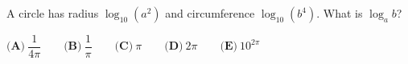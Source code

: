 A circle has radius $\log_{10}(a^2)$ and circumference $\log_{10}(b^4)$. What is $\log_ab$?

$\textbf{(A)}\ \dfrac{1}{4\pi}\qquad\textbf{(B)}\ \dfrac{1}{\pi}\qquad\textbf{(C)}\ \pi\qquad\textbf{(D)}\ 2\pi\qquad\textbf{(E)}\ 10^{2\pi}$
